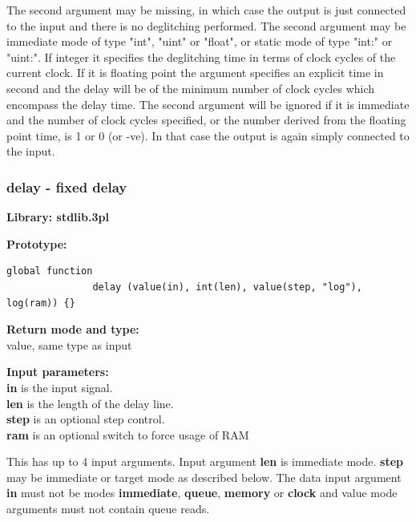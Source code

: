             The second argument may be missing, in which case the output is just
            connected to the input and there is no deglitching performed. The
            second argument may be immediate mode of type "int", "uint" or
            "float", or static mode of type "int:" or "uint:". If integer it
            specifies the deglitching time in terms of clock cycles of the
            current clock. If it is floating point the argument specifies an
            explicit time in second and the delay will be of the minimum
            number of clock cycles which encompass the delay time. The second
            argument will be ignored if it is immediate and the number of clock
            cycles specified, or the number derived from the floating point
            time, is 1 or 0 (or -ve). In that case the output is again simply
            connected to the input.




        \subsubsection{delay - fixed delay}\label{sec:lfdelay}

            {\bf Library: stdlib.3pl}

            {\bf Prototype:} \\
            \vsp
            \begin{lstlisting}[gobble=12, language=threepl]
               global function
               delay (value(in), int(len), value(step, "log"), log(ram)) {}
            \end{lstlisting}

            {\bf Return mode and type:} \\
            value, same type as input

            {\bf Input parameters:} \\            
            {\bf in} is the input signal. \\
            {\bf len} is the length of the delay line.\\
            {\bf step} is an optional step control.\\
            {\bf ram} is an optional switch to force usage of RAM

            This has up to 4 input arguments. Input argument {\bf len} is
            immediate mode. {\bf step} may be immediate or target mode as
            described below. The data input argument {\bf in} must not be modes
            {\bf immediate}, {\bf queue}, {\bf memory} or {\bf clock} and value
            mode arguments must not contain queue reads.
            
